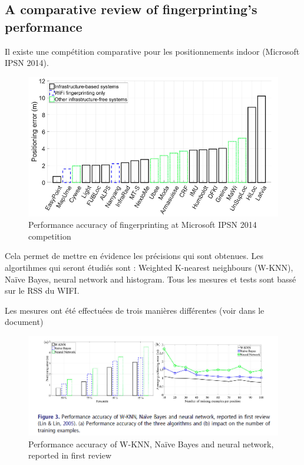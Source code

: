 \subsection{A comparative review of fingerprinting’s performance}
Il existe une compétition comparative pour les positionnements indoor (Microsoft IPSN 2014).

\begin{figure}[H]
	\begin{center}
		\includegraphics[scale=1]{figures/Competition.png}
		\caption{Performance accuracy of fingerprinting at Microsoft IPSN 2014 competition}
		\label{fig:Competition} %
	\end{center}
\end{figure}

Cela permet de mettre en évidence les précisions qui sont obtenues. Les algortihmes qui seront étudiés sont : Weighted K-nearest neighbours (W-KNN), Naïve Bayes, neural network and histogram. Tous les mesures et tests sont bassé sur le RSS du WIFI. 

Les mesures ont été effectuées de trois manières différentes (voir dans le document)

\begin{figure}[H]
	\begin{center}
		\includegraphics[scale=1]{figures/PerfAccu.png}
		\caption{Performance accuracy of W-KNN, Naïve Bayes and neural network, reported in first review}
		\label{fig:PerfAccu} %
	\end{center}
\end{figure}

